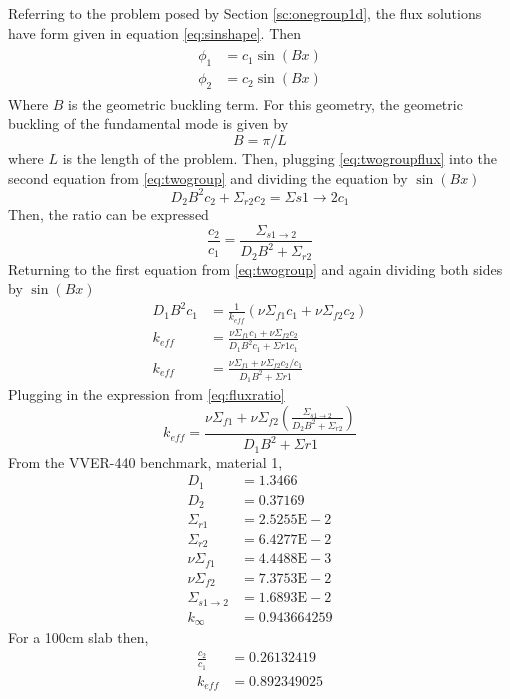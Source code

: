 \documentclass{article}
\begin{document}
  Referring to the problem posed by Section \ref{sc:onegroup1d}, the flux 
  solutions have form given in equation \eqref{eq:sinshape}. Then
  \begin{align} \label{eq:twogroupflux}
  \begin{split}
    \phi_1 &= c_1 \sin(Bx) \\
    \phi_2 &= c_2 \sin(Bx)
  \end{split}
  \end{align}
  Where $B$ is the geometric buckling term. For this geometry, the geometric 
  buckling of the fundamental mode is given by 
  \begin{equation}
    B = \pi/L
  \end{equation}
  where $L$ is the length of the problem. Then, plugging 
  \eqref{eq:twogroupflux} into the second equation from \eqref{eq:twogroup} 
  and dividing the equation by $\sin(Bx)$
  \begin{equation}
    D_2 B^2 c_2 + \Sigma_{r2} c_2 = \Sigma{s1\rightarrow2} c_1
  \end{equation}
  Then, the ratio can be expressed
  \begin{equation} \label{eq:fluxratio}
    \frac{c_2}{c_1} = \frac{\Sigma_{s1\rightarrow2}}{D_2 B^2 + \Sigma_{r2}}
  \end{equation}
  Returning to the first equation from \eqref{eq:twogroup} and again dividing
  both sides by $\sin(Bx)$
  \begin{align}
    D_1 B^2 c_1 &= \frac{1}{k_{eff}} \left( \nu \Sigma_{f1} c_1 + 
      \nu \Sigma_{f2} c_2\right)\\
    k_{eff} &= \frac{\nu \Sigma_{f1} c_1 + \nu \Sigma_{f2} c_2}
      {D_1 B^2 c_1 + \Sigma{r1} c_1}\\
    k_{eff} &= \frac{\nu \Sigma_{f1} + \nu \Sigma_{f2} c_2/c_1}
      {D_1 B^2 + \Sigma{r1}}
  \end{align}
  Plugging in the expression from \eqref{eq:fluxratio}
  \begin{equation}
    k_{eff} = \frac{\nu \Sigma_{f1} + \nu \Sigma_{f2} 
      \left(\frac{\Sigma_{s1\rightarrow2}}{D_2B^2+\Sigma_{r2}}\right)}
      {D_1 B^2 + \Sigma{r1}}
  \end{equation}
  From the VVER-440 benchmark, material 1,
  \begin{align*}
    D_1 &= 1.3466  \\
    D_2 &= 0.37169 \\
    \Sigma_{r1} &= 2.5255\text{E}-2\\
    \Sigma_{r2} &= 6.4277\text{E}-2\\
    \nu \Sigma_{f1}  &= 4.4488\text{E}-3\\
    \nu \Sigma_{f2}  &= 7.3753\text{E}-2\\
    \Sigma_{s1\rightarrow2} &= 1.6893\text{E}-2 \\
    k_{\infty} &= 0.943664259
  \end{align*}
  For a 100cm slab then,
  \begin{align*}
    \frac{c_2}{c_1} &= 0.26132419 \\
    k_{eff} &= 0.892349025
  \end{align*}
\end{document}
